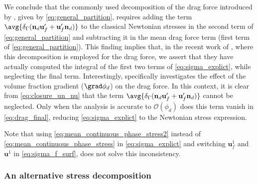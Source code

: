 We conclude that the commonly used decomposition of the drag force introduced by \citet{zhang1997momentum,jackson2000}, given by \ref{eq:general_partition}, requires adding the term  $\avg{\delta_\Gamma (\textbf{n}_d \textbf{u}_f'+  \textbf{u}_f' \textbf{n}_d)}$ to the classical Newtonian stresses in the second term of \ref{eq:general_partition} and subtracting it in the mean drag force term (first term of \ref{eq:general_partition}). 
This finding implies that, in the recent work of \citet{wang2021numerical, wang2024effect}, where this decomposition is employed for the drag force, we assert that they have actually computed the integral of the first two terms of \ref{eq:sigma_explict}, while neglecting the final term. 
Interestingly, \citet{wang2024effect} specifically investigates the effect of the volume fraction gradient ($\grad \phi_d$) on the drag force. 
In this context, it is clear from \eqref{eq:closure_un_nu} that the term $\avg{\delta_\Gamma (\textbf{n}_d \textbf{u}_f'+  \textbf{u}_f' \textbf{n}_d)}$ cannot be neglected. 
Only when the analysis is accurate to $\mathcal{O}(\phi_d)$ does this term vanish in \ref{eq:drag_final}, reducing \ref{eq:sigma_explict} to the Newtonian stress expression. 

Note that using \ref{eq:mean_continuous_phase_stress2} instead of \ref{eq:mean_continuous_phase_stress} in \ref{eq:sigma_explict} and switching $\textbf{u}_f^1$ and $\textbf{u}^1$ in \ref{eq:sigma_f_surf}, does not solve this inconsistency. 

\subsubsection{An alternative stress decomposition}

